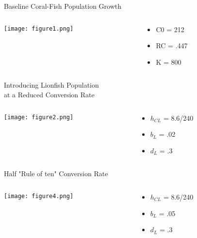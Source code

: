 \documentclass{beamer}
\begin{document}
\begin{frame}{Baseline Coral-Fish Population Growth}
\begin{columns}[t]
\begin{column}[T]{8cm}
\texttt{[image: figure1.png]}
\end{column}
\begin{column}[T]{3cm}

\begin{itemize}

\item C0 = 212

\item RC = .447

\item K = 800

\end{itemize}

\end{column}
\end{columns}
\end{frame}

\begin{frame}{Introducing Lionfish Population\\ at a Reduced Conversion Rate}
\begin{columns}[t]
\begin{column}[T]{8cm}
\texttt{[image: figure2.png]}
\end{column}
\begin{column}[T]{3cm}
\begin{itemize}

\item $h_{CL}$ = 8.6/240

\item $b_{L}$ = .02

\item $d_{L}$ = .3


\end{itemize}
\end{column}
\end{columns}
\end{frame}

\begin{frame}{Half "Rule of ten" Conversion Rate}
\begin{columns}[t]
\begin{column}[T]{8cm}
\texttt{[image: figure4.png]}
\end{column}
\begin{column}[T]{3cm}
\begin{itemize}

\item $h_{CL}$ = 8.6/240

\item $b_{L}$ = .05

\item $d_{L}$ = .3


\end{itemize}
\end{column}
\end{columns}
\end{frame}
\end{document}

